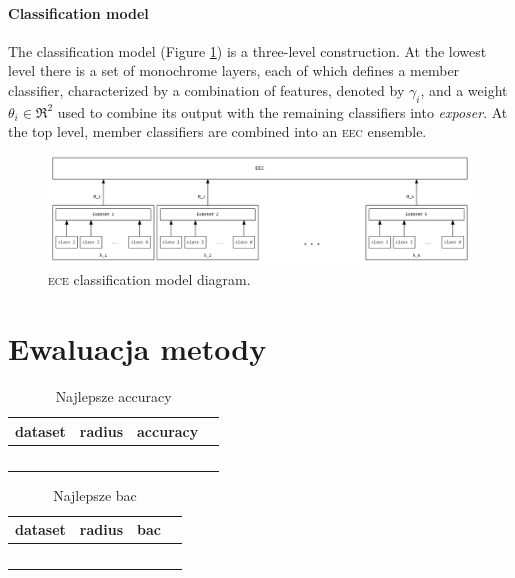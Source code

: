 \documentclass[]{article}
\begin{document}
\paragraph{Classification model}

The classification model (Figure \ref{fig:model}) is a three-level construction. At the lowest level there is a set of monochrome layers, each of which defines a member classifier, characterized by a combination of features, denoted by $\gamma_i$, and a weight $\theta_i \in \Re^2$ used to combine its output with the remaining classifiers into \emph{exposer}. At the top level, member classifiers are combined into an \textsc{eec} ensemble.

\begin{figure}[hbt]
	\center
  \includegraphics[width=\textwidth]{figures/eec_model}
  
  \caption{\textsc{ece} classification model diagram.}
	\label{fig:model}
\end{figure}

\section{Ewaluacja metody}

\begin{table}[!ht]
	\caption{Najlepsze accuracy}
    \label{tab:results}
	\centering
	\begin{tabular}{lSSS}
		\toprule
		{dataset} & {radius} & {accuracy} \\\midrule
	    {\emph{\filename} & \radius & \accuracy\\}%
	\end{tabular}
\end{table}

\begin{table}[!ht]
	\caption{Najlepsze bac}
    \label{tab:results}
	\centering
	\begin{tabular}{lSSS}
		\toprule
		{dataset} & {radius} & {bac} \\\midrule
	    {\emph{\filename} & \radius & \bac\\}%
	\end{tabular}
\end{table}





\end{document}
